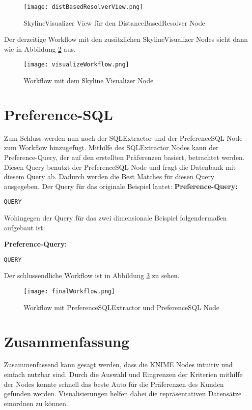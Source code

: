 \begin{figure}[H]
	\centering
	\texttt{[image: distBasedResolverView.png]}
	\caption{SkylineVisualizer View für den DistanceBasedResolver Node}
	\label{img:distBasedResolverView}
\end{figure} 

Der derzeitige Workflow mit den zusätzlichen SkylineVisualizer Nodes sieht dann wie in Abbildung \ref{img:visualizeWorkflow} aus.

\begin{figure}[H]
	\centering
	\texttt{[image: visualizeWorkflow.png]}
	\caption{Workflow mit dem Skyline Visualizer Node}
	\label{img:visualizeWorkflow}
\end{figure} 

\section{Preference-SQL}
\label{ch:Evaluierung:sec:prefSQL}
Zum Schluss werden nun noch der SQLExtractor und der PreferenceSQL Node zum Workflow hinzugefügt. Mithilfe des SQLExtractor Nodes kann der Preference-Query, der auf den erstellten Präferenzen basiert, betrachtet werden. Diesen Query benutzt der PreferenceSQL Node und fragt die Datenbank mit diesem Query ab. Dadurch werden die Best Matches für diesen Query ausgegeben. Der Query für das originale Beispiel lautet: 
\textbf{Preference-Query:}
\begin{lstlisting}
QUERY
\end{lstlisting}

Wohingegen der Query für das zwei dimensionale Beispiel folgendermaßen aufgebaut ist:

\textbf{Preference-Query:}
\begin{lstlisting}
QUERY
\end{lstlisting}

Der schlussendliche Workflow ist in Abbildung \ref{img:finalWorkflow} zu sehen. 
 
\begin{figure}[H]
	\centering
	\texttt{[image: finalWorkflow.png]}
	\caption{Workflow mit PreferenceSQLExtractor und PreferenceSQL Node}
	\label{img:finalWorkflow}
\end{figure} 
\section{Zusammenfassung}
\label{ch:Evaluierung:sec:zusammenfassung}
Zusammenfassend kann gesagt werden, dass die KNIME Nodes intuitiv und einfach nutzbar sind. Durch die Auswahl und Eingrenzen der Kriterien mithilfe der Nodes konnte schnell das beste Auto für die Präferenzen des Kunden gefunden werden. Visualisierungen helfen dabei die repräsentativen Datensätze einordnen zu können. 
